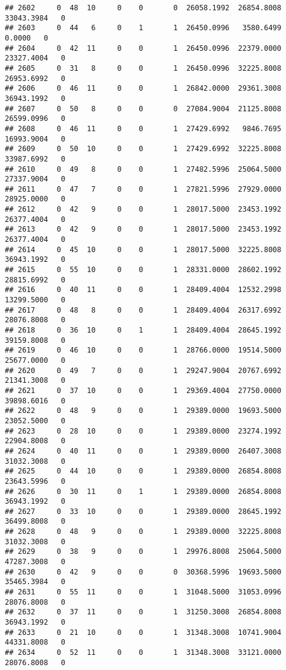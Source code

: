 \documentclass[
]{article}
\begin{document}
\begin{enumerate}
\begin{verbatim}
## 2602     0  48  10     0    0       0  26058.1992  26854.8008  33043.3984   0
## 2603     0  44   6     0    1       1  26450.0996   3580.6499      0.0000   0
## 2604     0  42  11     0    0       1  26450.0996  22379.0000  23327.4004   0
## 2605     0  31   8     0    0       1  26450.0996  32225.8008  26953.6992   0
## 2606     0  46  11     0    0       1  26842.0000  29361.3008  36943.1992   0
## 2607     0  50   8     0    0       0  27084.9004  21125.8008  26599.0996   0
## 2608     0  46  11     0    0       1  27429.6992   9846.7695  16993.9004   0
## 2609     0  50  10     0    0       1  27429.6992  32225.8008  33987.6992   0
## 2610     0  49   8     0    0       1  27482.5996  25064.5000  27337.9004   0
## 2611     0  47   7     0    0       1  27821.5996  27929.0000  28925.0000   0
## 2612     0  42   9     0    0       1  28017.5000  23453.1992  26377.4004   0
## 2613     0  42   9     0    0       1  28017.5000  23453.1992  26377.4004   0
## 2614     0  45  10     0    0       1  28017.5000  32225.8008  36943.1992   0
## 2615     0  55  10     0    0       1  28331.0000  28602.1992  28815.6992   0
## 2616     0  40  11     0    0       1  28409.4004  12532.2998  13299.5000   0
## 2617     0  48   8     0    0       1  28409.4004  26317.6992  28076.8008   0
## 2618     0  36  10     0    1       1  28409.4004  28645.1992  39159.8008   0
## 2619     0  46  10     0    0       1  28766.0000  19514.5000  25677.0000   0
## 2620     0  49   7     0    0       1  29247.9004  20767.6992  21341.3008   0
## 2621     0  37  10     0    0       1  29369.4004  27750.0000  39898.6016   0
## 2622     0  48   9     0    0       1  29389.0000  19693.5000  23052.5000   0
## 2623     0  28  10     0    0       1  29389.0000  23274.1992  22904.8008   0
## 2624     0  40  11     0    0       1  29389.0000  26407.3008  31032.3008   0
## 2625     0  44  10     0    0       1  29389.0000  26854.8008  23643.5996   0
## 2626     0  30  11     0    1       1  29389.0000  26854.8008  36943.1992   0
## 2627     0  33  10     0    0       1  29389.0000  28645.1992  36499.8008   0
## 2628     0  48   9     0    0       1  29389.0000  32225.8008  31032.3008   0
## 2629     0  38   9     0    0       1  29976.8008  25064.5000  47287.3008   0
## 2630     0  42   9     0    0       0  30368.5996  19693.5000  35465.3984   0
## 2631     0  55  11     0    0       1  31048.5000  31053.0996  28076.8008   0
## 2632     0  37  11     0    0       1  31250.3008  26854.8008  36943.1992   0
## 2633     0  21  10     0    0       1  31348.3008  10741.9004  44331.8008   0
## 2634     0  52  11     0    0       1  31348.3008  33121.0000  28076.8008   0

\end{verbatim}
\end{enumerate}
\end{document}
